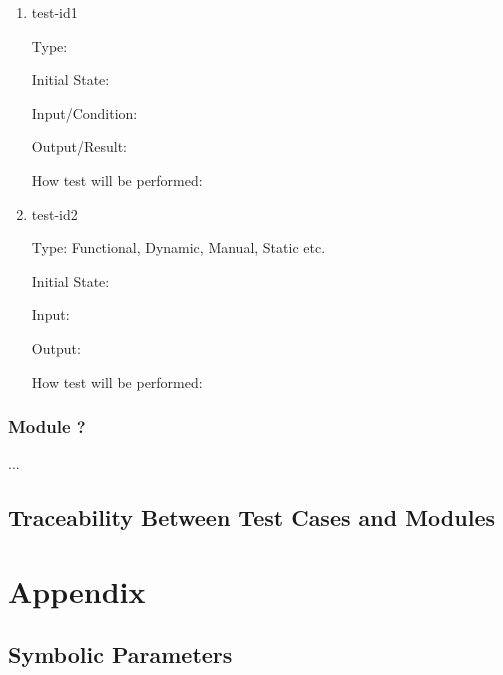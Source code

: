 \documentclass[12pt, titlepage]{article}
\begin{document}
\begin{enumerate}

\item{test-id1\\}

Type: 
					
Initial State: 
					
Input/Condition: 
					
Output/Result: 
					
How test will be performed: 
					
\item{test-id2\\}

Type: Functional, Dynamic, Manual, Static etc.
					
Initial State: 
					
Input: 
					
Output: 
					
How test will be performed: 

\end{enumerate}

\subsubsection{Module ?}

...

\subsection{Traceability Between Test Cases and Modules}

				




\newpage

\section{Appendix}


\subsection{Symbolic Parameters}
\end{document}

